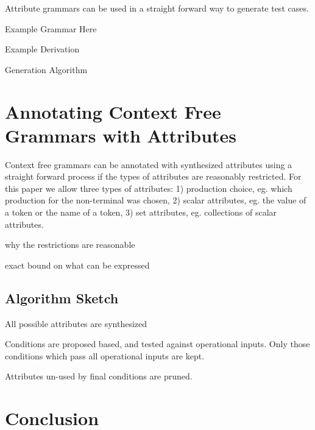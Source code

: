 \begin{multicols}{2}
Attribute grammars can be used in a straight forward way to generate test cases. 

Example Grammar Here

Example Derivation

Generation Algorithm

\section{Annotating Context Free Grammars with Attributes}

Context free grammars can be annotated with synthesized attributes using a
straight forward process if the types of attributes are reasonably restricted.
For this paper we allow three types of attributes: 1) production choice, eg.
which production for the non-terminal was chosen, 2) scalar attributes, eg. the
value of a token or the name of a token, 3) set attributes, eg. collections of
scalar attributes. 

why the restrictions are reasonable 

exact bound on what can be expressed

\subsection{Algorithm Sketch}

All possible attributes are synthesized

Conditions are proposed based, and tested against operational inputs. Only those
conditions which pass all operational inputs are kept.

Attributes un-used by final conditions are pruned.

\section{Conclusion}


\nocite{*}



\end{multicols}

